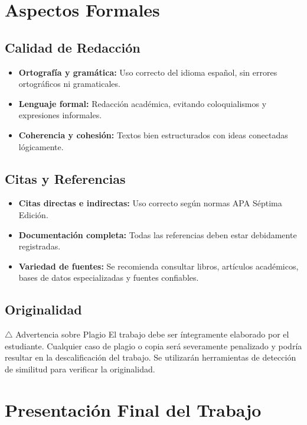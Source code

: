 \documentclass[12pt,a4paper]{article}
\begin{document}
\section{Aspectos Formales}

\subsection{Calidad de Redacción}

\begin{itemize}
  \item \textbf{Ortografía y gramática:} Uso correcto del idioma español, sin errores ortográficos ni gramaticales.
  \item \textbf{Lenguaje formal:} Redacción académica, evitando coloquialismos y expresiones informales.
  \item \textbf{Coherencia y cohesión:} Textos bien estructurados con ideas conectadas lógicamente.
\end{itemize}

\subsection{Citas y Referencias}

\begin{itemize}
  \item \textbf{Citas directas e indirectas:} Uso correcto según normas APA Séptima Edición.
  \item \textbf{Documentación completa:} Todas las referencias deben estar debidamente registradas.
  \item \textbf{Variedad de fuentes:} Se recomienda consultar libros, artículos académicos, bases de datos especializadas y fuentes confiables.
\end{itemize}

\subsection{Originalidad}

\begin{warningbox}{$\triangle$ Advertencia sobre Plagio}
  El trabajo debe ser íntegramente elaborado por el estudiante. Cualquier caso de plagio o copia será severamente penalizado y podría resultar en la descalificación del trabajo. Se utilizarán herramientas de detección de similitud para verificar la originalidad.
\end{warningbox}

\section{Presentación Final del Trabajo}
\end{document}
